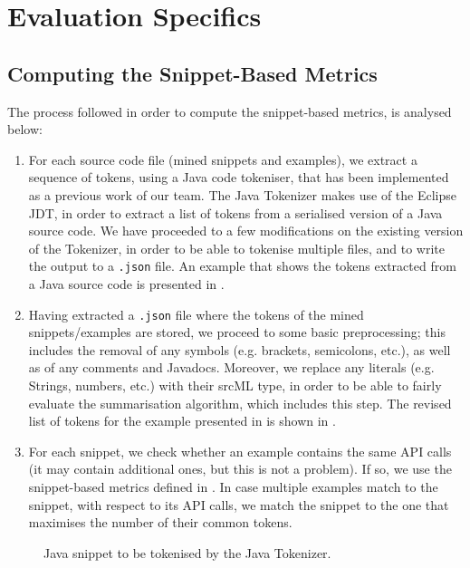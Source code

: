 \chapter{Evaluation Specifics}
\label{chap:evaluation-specifics}

\section{Computing the Snippet-Based Metrics}
\label{sec:snippet-based-metrics}

The process followed in order to compute the snippet-based metrics, is analysed below:

\begin{enumerate}
\item For each source code file (mined snippets and examples), we extract a sequence of tokens, using a Java code tokeniser, that has been implemented as a previous work of our team. The Java Tokenizer makes use of the Eclipse JDT, in order to extract a list of tokens from a serialised version of a Java source code. We have proceeded to a few modifications on the existing version of the Tokenizer, in order to be able to tokenise multiple files, and to write the output to a \texttt{.json} file. An example that shows the tokens extracted from a Java source code is presented in .
\item Having extracted a \texttt{.json} file where the tokens of the mined snippets/examples are stored, we proceed to some basic preprocessing; this includes the removal of any symbols (e.g. brackets, semicolons, etc.), as well as of any comments and Javadocs. Moreover, we replace any literals (e.g. Strings, numbers, etc.) with their srcML type, in order to be able to fairly evaluate the summarisation algorithm, which includes this step. The revised list of tokens for the example presented in  is shown in .
\item For each snippet, we check whether an example contains the same API calls (it may contain additional ones, but this is not a problem). If so, we use the snippet-based metrics defined in . In case multiple examples match to the snippet, with respect to its API calls, we match the snippet to the one that maximises the number of their common tokens.
\end{enumerate}

\begin{figure}[ht]

\vspace{-10pt}
\caption[Java snippet to be tokenised by the Java Tokenizer]{Java snippet to be tokenised by the Java Tokenizer.}
\label{listings:java-tokenizer-code}
\end{figure}

